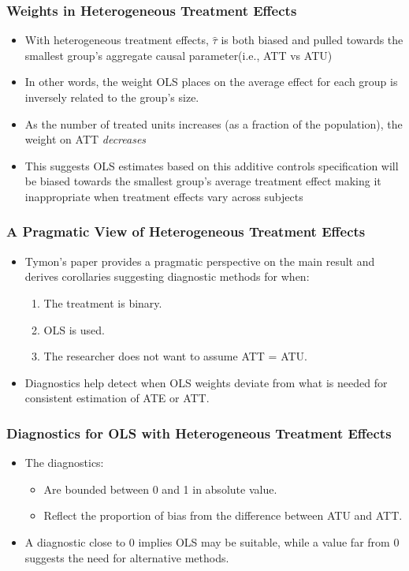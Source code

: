 \documentclass{beamer}
\begin{document}
\begin{frame}
\frametitle{Weights in Heterogeneous Treatment Effects}
\begin{itemize}
  \item With heterogeneous treatment effects, $\widehat{\tau}$ is both biased and pulled towards the smallest group's aggregate causal parameter(i.e., ATT vs ATU)
  \item In other words, the weight OLS places on the average effect for each group is inversely related to the group's size.
  \item As the number of treated units increases (as a fraction of the population), the weight on ATT \emph{decreases}
  \item This suggests OLS estimates based on this additive controls specification will be biased towards the smallest group's average treatment effect making it inappropriate when treatment effects vary across subjects
\end{itemize}
\end{frame}


\begin{frame}
\frametitle{A Pragmatic View of Heterogeneous Treatment Effects}
\begin{itemize}
  \item Tymon's paper provides a pragmatic perspective on the main result and derives corollaries suggesting diagnostic methods for when:
    \begin{enumerate}
      \item The treatment is binary.
      \item OLS is used.
      \item The researcher does not want to assume ATT = ATU.
    \end{enumerate}
  \item Diagnostics help detect when OLS weights deviate from what is needed for consistent estimation of ATE or ATT.
\end{itemize}
\end{frame}


\begin{frame}
\frametitle{Diagnostics for OLS with Heterogeneous Treatment Effects}
\begin{itemize}
  \item The diagnostics:
    \begin{itemize}
      \item Are bounded between 0 and 1 in absolute value.
      \item Reflect the proportion of bias from the difference between ATU and ATT.
    \end{itemize}
  \item A diagnostic close to 0 implies OLS may be suitable, while a value far from 0 suggests the need for alternative methods.
\end{itemize}
\end{frame}
\end{document}
